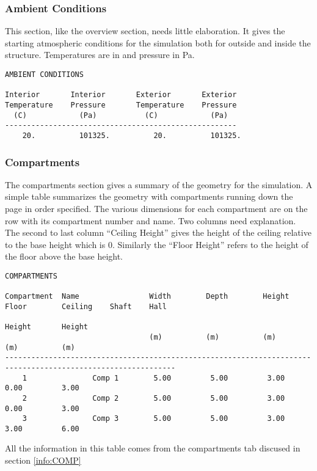\subsubsection{Ambient Conditions}

This section, like the overview section, needs little elaboration.  It gives the starting atmospheric conditions for the simulation both for outside and inside the structure. Temperatures are in \degc and pressure in Pa.
\begin{lstlisting}[basicstyle=\tiny]
AMBIENT CONDITIONS

Interior       Interior       Exterior       Exterior
Temperature    Pressure       Temperature    Pressure
  (C)            (Pa)           (C)            (Pa)
-----------------------------------------------------
    20.          101325.          20.          101325.
\end{lstlisting}

\subsubsection{Compartments}
The compartments section gives a summary of the geometry for the simulation.  A simple table summarizes the geometry with compartments running down the page in order specified.  The various dimensions for each compartment are on the row with its compartment number and name.  Two columns need explanation.  The second to last column ``Ceiling Height'' gives the height of the ceiling relative to the base height which is 0.  Similarly the ``Floor Height'' refers to the height of the floor above the base height.

\begin{lstlisting}[basicstyle=\tiny]
COMPARTMENTS

Compartment  Name                Width        Depth        Height       Floor        Ceiling    Shaft    Hall
                                                                        Height       Height
                                 (m)          (m)          (m)          (m)          (m)
-------------------------------------------------------------------------------------------------------------
    1               Comp 1        5.00         5.00         3.00         0.00         3.00
    2               Comp 2        5.00         5.00         3.00         0.00         3.00
    3               Comp 3        5.00         5.00         3.00         3.00         6.00                 
\end{lstlisting}
All the information in this table comes from the compartments tab discused in section  \ref{info:COMP}


